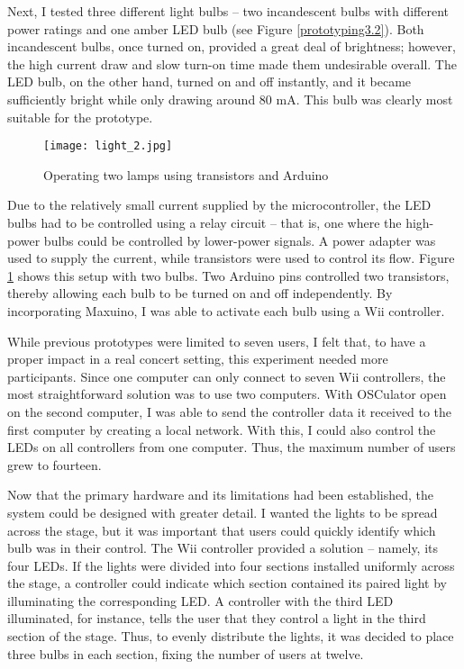 Next, I tested three different light bulbs -- two incandescent bulbs with different power ratings and one amber LED bulb (see Figure \ref{prototyping3.2}). Both incandescent bulbs, once turned on, provided a great deal of brightness; however, the high current draw and slow turn-on time made them undesirable overall. The LED bulb, on the other hand, turned on and off instantly, and it became sufficiently bright while only drawing around 80 mA. This bulb was clearly most suitable for the prototype.

\begin{figure}
	\centering

	\texttt{[image: light\_2.jpg]}
	\caption{Operating two lamps using transistors and Arduino}

	\label{prototyping3.3}
\end{figure}

Due to the relatively small current supplied by the microcontroller, the LED bulbs had to be controlled using a relay circuit -- that is, one where the high-power bulbs could be controlled by lower-power signals. A power adapter was used to supply the current, while transistors were used to control its flow. Figure \ref{prototyping3.3} shows this setup with two bulbs. Two Arduino pins controlled two transistors, thereby allowing each bulb to be turned on and off independently. By incorporating Maxuino, I was able to activate each bulb using a Wii controller.

While previous prototypes were limited to seven users, I felt that, to have a proper impact in a real concert setting, this experiment needed more participants. Since one computer can only connect to seven Wii controllers, the most straightforward solution was to use two computers. With OSCulator open on the second computer, I was able to send the controller data it received to the first computer by creating a local network. With this, I could also control the LEDs on all controllers from one computer. Thus, the maximum number of users grew to fourteen.


Now that the primary hardware and its limitations had been established, the system could be designed with greater detail. I wanted the lights to be spread across the stage, but it was important that users could quickly identify which bulb was in their control. The Wii controller provided a solution -- namely, its four LEDs. If the lights were divided into four sections installed uniformly across the stage, a controller could indicate which section contained its paired light by illuminating the corresponding LED. A controller with the third LED illuminated, for instance, tells the user that they control a light in the third section of the stage. Thus, to evenly distribute the lights, it was decided to place three bulbs in each section, fixing the number of users at twelve. %

